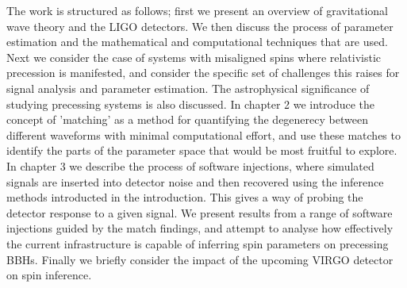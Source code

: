 \documentclass[]{article}
\begin{document}
The work is structured as follows; first we present an overview of gravitational wave theory and the LIGO detectors. We then discuss the process of parameter estimation and the mathematical and computational techniques that are used. Next we consider the case of systems with misaligned spins where relativistic precession is manifested, and consider the specific set of challenges this raises for signal analysis and parameter estimation. The astrophysical significance of studying precessing systems is also discussed. In chapter 2 we introduce the concept of 'matching' as a method for quantifying the degenerecy between different waveforms with minimal computational effort, and use these matches to identify the parts of the parameter space that would be most fruitful to explore. In chapter 3 we describe the process of software injections, where simulated signals are inserted into detector noise and then recovered using the inference methods introducted in the introduction. This gives a way of probing the detector response to a given signal. We present results from a range of software injections guided by the match findings, and attempt to analyse how effectively the current infrastructure is capable of inferring spin parameters on precessing BBHs. Finally we briefly consider the impact of the upcoming VIRGO detector on spin inference.
\end{document}
